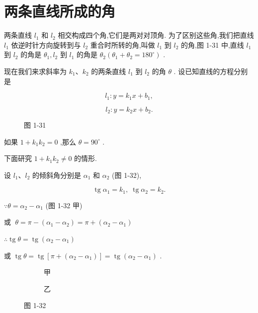 \documentclass[lang=cn,newtx,12pt,scheme=chinese]{elegantbook}
\begin{document}
\section{两条直线所成的角}

两条直线 \({l}_{1}\) 和 \({l}_{2}\) 相交构成四个角,它们是两对对顶角. 为了区别这些角,我们把直线 \({l}_{1}\) 依逆时针方向旋转到与 \({l}_{2}\) 重合时所转的角,叫做 \({l}_{1}\) 到 \({l}_{2}\) 的角,图 1-31 中,直线 \({l}_{1}\) 到 \({l}_{2}\) 的角是 \({\theta }_{1},{l}_{2}\) 到 \({l}_{1}\) 的角是 \({\theta }_{2}\left( {{\theta }_{1} + {\theta }_{2} = {180}^{ \circ }}\right)\) .

现在我们来求斜率为 \({k}_{1}\text{、}{k}_{2}\) 的两条直线 \({l}_{1}\) 到 \({l}_{2}\) 的角 \(\theta\) . 设已知直线的方程分别是

\[
    {l}_{1} : y = {k}_{1}x + {b}_{1},
\]

\[
    {l}_{2} : y = {k}_{2}x + {b}_{2}.
\]

\begin{figure}[h]
  \centering
  
  \caption{图 1-31}
\end{figure}

如果 \(1 + {k}_{1}{k}_{2} = 0\) ,那么 \(\theta = {90}^{ \circ }\) .

下面研究 \(1 + {k}_{1}{k}_{2} \neq 0\) 的情形.

设 \({l}_{1}\text{、}{l}_{2}\) 的倾斜角分别是 \({\alpha }_{1}\) 和 \({\alpha }_{2}\) (图 1-32),

\[
  \operatorname{tg}{\alpha }_{1} = {k}_{1},\;\operatorname{tg}{\alpha }_{2} = {k}_{2}.
\]

\(\because \theta = {\alpha }_{2} - {\alpha }_{1}\) (图 1-32 甲)

或 \(\;\theta = \pi - \left( {{\alpha }_{1} - {\alpha }_{2}}\right) = \pi + \left( {{\alpha }_{2} - {\alpha }_{1}}\right)\)

\(\therefore \operatorname{tg}\theta = \operatorname{tg}\left( {{\alpha }_{2} - {\alpha }_{1}}\right)\)

或 \(\operatorname{tg}\theta = \operatorname{tg}\left\lbrack {\pi + \left( {{\alpha }_{2} - {\alpha }_{1}}\right) }\right\rbrack = \operatorname{tg}\left( {{\alpha }_{2} - {\alpha }_{1}}\right)\) .

\begin{figure}[h]
	\centering
	\begin{subfigure}[h]{0.45\textwidth}
		\centering
		
		\caption{甲}
	\end{subfigure}
	\hfill %
	\begin{subfigure}[h]{0.45\textwidth}
		\centering
		
		\caption{乙}
	\end{subfigure}
	\caption{图 1-32}
\end{figure}
\end{document}
